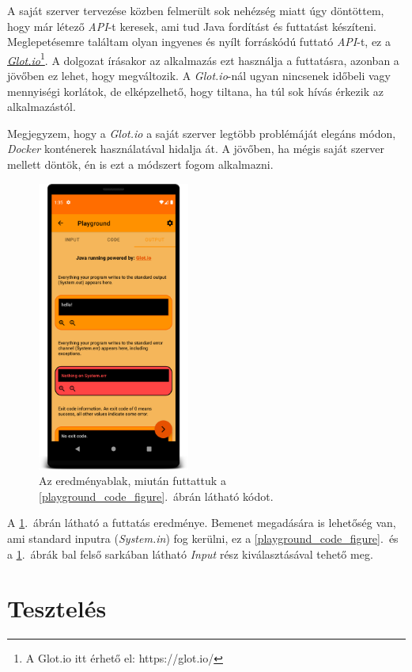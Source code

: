 \documentclass[12pt,a4paper]{article}
\begin{document}
	A saját szerver tervezése közben felmerült sok nehézség miatt úgy döntöttem, hogy már létező \textit{API}-t keresek, ami tud Java fordítást és futtatást készíteni.
	Meglepetésemre találtam olyan ingyenes és nyílt forráskódú futtató \textit{API}-t, ez a \href{https://glot.io/}{\textit{Glot.io}}\footnote{A Glot.io itt érhető el: https://glot.io/}. A dolgozat írásakor az alkalmazás ezt használja a futtatásra, azonban a jövőben ez lehet, hogy megváltozik. A \textit{Glot.io}-nál ugyan nincsenek időbeli vagy mennyiségi korlátok, de elképzelhető, hogy tiltana, ha túl sok hívás érkezik az alkalmazástól.
	
	Megjegyzem, hogy a \textit{Glot.io} a saját szerver legtöbb problémáját elegáns módon, \textit{Docker} konténerek használatával hidalja át. A jövőben, ha mégis saját szerver mellett döntök, én is ezt a módszert fogom alkalmazni.

	\begin{figure}[h!]
		\centering
		\includegraphics[width=5cm]{playground_output}
		\caption{Az eredményablak, miután futtattuk a \ref{playground_code_figure}.\ ábrán látható kódot.}
		\label{playground_output_figure}
	\end{figure}

	A \ref{playground_output_figure}.\ ábrán látható a futtatás eredménye. Bemenet megadására is lehetőség van, ami standard inputra (\textit{System.in}) fog kerülni, ez a \ref{playground_code_figure}.\ és a \ref{playground_output_figure}.\ ábrák bal felső sarkában látható \textit{Input} rész kiválasztásával tehető meg.

	\section{Tesztelés}
\end{document}
